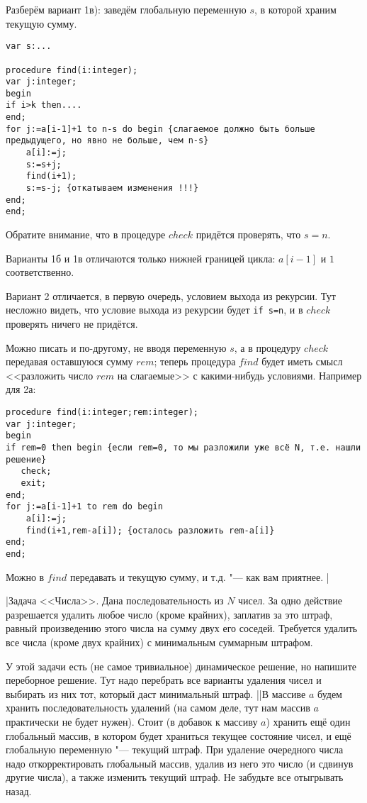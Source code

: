 Разберём вариант 1в): заведём глобальную переменную $s$, в которой храним текущую сумму. 

\begin{codesampleo}\begin{verbatim}
var s:...

procedure find(i:integer);
var j:integer;
begin
if i>k then....
end;
for j:=a[i-1]+1 to n-s do begin {слагаемое должно быть больше предыдущего, но явно не больше, чем n-s}
    a[i]:=j;
    s:=s+j;
    find(i+1);
    s:=s-j; {откатываем изменения !!!}
end;
end;
\end{verbatim}\end{codesampleo}

Обратите внимание, что в процедуре $check$ придётся проверять, что $s=n$.

Варианты 1б и 1в отличаются только нижней границей цикла: $a[i-1]$ и $1$ соответственно.

Вариант 2 отличается, в первую очередь, условием выхода из рекурсии. Тут несложно видеть, что 
условие выхода из рекурсии будет \texttt{if s=n}, и в $check$ проверять ничего не придётся.

Можно писать и по-другому, не вводя переменную $s$, а в процедуру $check$ передавая оставшуюся сумму $rem$; теперь процедура $find$ будет иметь смысл <<разложить число $rem$ на слагаемые>> с какими-нибудь условиями. Например для 2а:
\begin{codesampleo}\begin{verbatim}
procedure find(i:integer;rem:integer); 
var j:integer;
begin
if rem=0 then begin {если rem=0, то мы разложили уже всё N, т.е. нашли решение}
   check;
   exit;
end;
for j:=a[i-1]+1 to rem do begin
    a[i]:=j;
    find(i+1,rem-a[i]); {осталось разложить rem-a[i]}
end;
end;
\end{verbatim}\end{codesampleo}
Можно в $find$ передавать и текущую сумму, и т.д. "--- как вам приятнее.
|

\task|Задача <<Числа>>. Дана последовательность из $N$ чисел. За одно действие разрешается удалить любое число (кроме крайних), заплатив за это штраф, равный произведению этого числа на сумму двух его соседей. Требуется удалить все числа (кроме двух крайних) с минимальным суммарным штрафом. 

У этой задачи есть (не самое тривиальное) динамическое решение, но напишите переборное решение. Тут надо перебрать все варианты удаления чисел и выбирать из них тот, который даст минимальный штраф.
||В массиве $a$ будем хранить последовательность удалений (на самом деле, тут нам массив $a$ практически не будет нужен). Стоит (в добавок к массиву $a$) хранить ещё один
глобальный массив, в котором будет храниться текущее состояние чисел, и ещё глобальную 
переменную "--- текущий штраф. При удаление очередного числа надо откорректировать глобальный массив, удалив из него это число (и сдвинув другие числа), а также изменить текущий штраф. Не забудьте все отыгрывать назад. 

